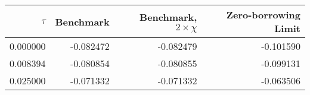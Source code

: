 \begin{tabular}{rrrr}
\toprule
   $\tau$ &  Benchmark &  Benchmark, $2 \times \chi$ &  Zero-borrowing Limit \\
\midrule
 0.000000 &  -0.082472 &                   -0.082479 &             -0.101590 \\
 0.008394 &  -0.080854 &                   -0.080855 &             -0.099131 \\
 0.025000 &  -0.071332 &                   -0.071332 &             -0.063506 \\
\bottomrule
\end{tabular}
